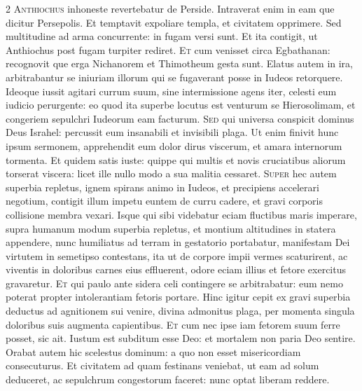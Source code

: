 \begin{multicols*}{2}
\lettrine[lines=2]{\zallmancaps \color{Blue} A}{nthiochus} inhoneste revertebatur de Perside. Intraverat enim in eam que dicitur Persepolis. Et temptavit expoliare templa, et civitatem opprimere. Sed multitudine ad arma concurrente: in fugam versi sunt. Et ita contigit, ut Anthiochus post fugam turpiter rediret.
\lettrine[lines=2]{\zallmancaps \color{Red} E}{t} cum venisset circa Egbathanan: recognovit que erga Nichanorem et Thimotheum gesta sunt. Elatus autem in ira, arbitrabantur se iniuriam illorum qui se fugaverant posse in Iudeos retorquere. Ideoque iussit agitari currum suum, sine intermissione agens iter, celesti eum iudicio perurgente: eo quod ita superbe locutus est venturum se Hierosolimam, et congeriem sepulchri Iudeorum eam facturum.
\lettrine[lines=2]{\zallmancaps \color{Blue} S}{ed} qui universa conspicit dominus Deus Israhel: percussit eum insanabili et invisibili plaga. Ut enim finivit hunc ipsum sermonem, apprehendit eum dolor dirus viscerum, et amara internorum tormenta. Et quidem satis iuste: quippe qui multis et novis cruciatibus aliorum torserat viscera: licet ille nullo modo a sua malitia cessaret.
\lettrine[lines=2]{\zallmancaps \color{Red} S}{uper} hec autem superbia repletus, ignem spirans animo in Iudeos, et precipiens accelerari negotium, contigit illum impetu euntem de curru cadere, et gravi corporis collisione membra vexari. Isque qui sibi videbatur eciam fluctibus maris imperare, supra humanum modum superbia repletus, et montium altitudines in statera appendere, nunc humiliatus ad terram in gestatorio portabatur, manifestam Dei virtutem in semetipso contestans, ita ut de corpore impii vermes scaturirent, ac viventis in doloribus carnes eius effluerent, odore eciam illius et fetore exercitus gravaretur.
\lettrine[lines=2]{\zallmancaps \color{Blue} E}{t} qui paulo ante sidera celi contingere se arbitrabatur: eum nemo poterat propter intolerantiam fetoris portare. Hinc igitur cepit ex gravi superbia deductus ad agnitionem sui venire, divina admonitus plaga, per momenta singula doloribus suis augmenta capientibus.
\lettrine[lines=2]{\zallmancaps \color{Red} E}{t} cum nec ipse iam fetorem suum ferre posset, sic ait. Iustum est subditum esse Deo: et mortalem non paria Deo sentire. Orabat autem hic scelestus dominum: a quo non esset misericordiam consecuturus. Et civitatem ad quam festinans veniebat, ut eam ad solum deduceret, ac sepulchrum congestorum faceret: nunc optat liberam reddere.

\end{multicols*}
